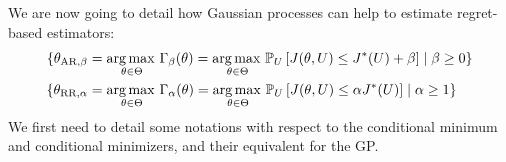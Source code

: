 \documentclass[../../Main_ManuscritThese.tex]{subfiles}
\begin{document}
We are now going to detail how Gaussian processes can help to estimate regret-based estimators:
\begin{align}
  \{ {\theta}_{\mathrm{AR,\beta}} &= \operatorname*{arg\,max \,}_{\theta\in\Theta} \Gamma_\beta(\theta) = \operatorname*{arg\,max \,}_{\theta\in\Theta} \mathbb{P}_{U}\left[J(\theta, U) \leq J^*(U) + \beta \right] \mid \beta \geq 0 \} \\
\{ {\theta}_{\mathrm{RR,\alpha}} &= \operatorname*{arg\,max \,}_{\theta\in\Theta} \Gamma_\alpha(\theta) = \operatorname*{arg\,max \,}_{\theta\in\Theta}\mathbb{P}_{U}\left[J(\theta, U) \leq \alpha J^*(U)\right] \mid \alpha \geq 1 \}
\end{align}
We first need to detail some notations with respect to the conditional minimum and conditional minimizers, and their equivalent for the GP.
\end{document}
